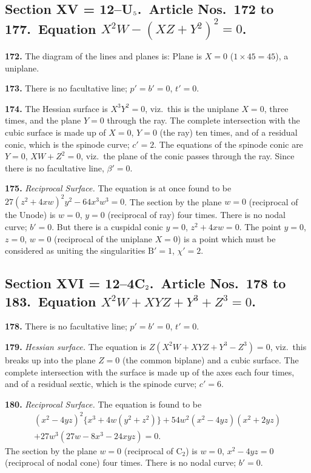 \documentclass[11pt,a4paper]{article}
\theoremstyle{definition}
\begin{document}
\subsection*{Section XV = 12--U$_{\mbox{\scriptsize 5}}$.\ Article Nos.\ 172 to 177.\ Equation $X^2W-(XZ+Y^2)^2=0$.}

\noindent\textbf{172.} The diagram of the lines and planes is: Plane is $X=0$ ($1\times 45=45$), a uniplane.

\noindent\textbf{173.} There is no facultative line; $p'=b'=0$, $t'=0$.

\noindent\textbf{174.} The Hessian surface is $X^3Y^2=0$, viz.\ this is the uniplane $X=0$, three times, and the plane $Y=0$ through the ray. The complete intersection with the cubic surface is made up of $X=0$, $Y=0$ (the ray) ten times, and of a residual conic, which is the spinode curve; $c'=2$. The equations of the spinode conic are $Y=0$, $XW+Z^2=0$, viz.\ the plane of the conic passes through the ray. Since there is no facultative line, $\beta'=0$.

\setcounter{page}{440}

\noindent\textbf{175.} \textit{Reciprocal Surface.} The equation is at once found to be $27(z^2+4xw)^2y^2-64x^3w^3=0$. The section by the plane $w=0$ (reciprocal of the Unode) is $w=0$, $y=0$ (reciprocal of ray) four times. There is no nodal curve; $b'=0$. But there is a cuspidal conic $y=0$, $z^2+4xw=0$. The point $y=0$, $z=0$, $w=0$ (reciprocal of the uniplane $X=0$) is a point which must be considered as uniting the singularities $\mathrm{B}'=1$, $\chi'=2$.

\subsection*{Section XVI = 12--4C$_{\mbox{\scriptsize 2}}$.\ Article Nos.\ 178 to 183.\ Equation $X^2W+XYZ+Y^3+Z^3=0$.}

\noindent\textbf{178.} There is no facultative line; $p'=b'=0$, $t'=0$.

\noindent\textbf{179.} \textit{Hessian surface.} The equation is $Z(X^2W+XYZ+Y^3-Z^3)=0$, viz.\ this breaks up into the plane $Z=0$ (the common biplane) and a cubic surface. The complete intersection with the surface is made up of the axes each four times, and of a residual sextic, which is the spinode curve; $c'=6$.

\noindent\textbf{180.} \textit{Reciprocal Surface.} The equation is found to be
\begin{multline*}
(x^2-4yz)^2\{x^3+4w(y^2+z^2)\} + 54w^2(x^2-4yz)(x^2+2yz) \\
+ 27w^3(27w-8x^3-24xyz)=0.
\end{multline*}
The section by the plane $w=0$ (reciprocal of C$_2$) is $w=0$, $x^2-4yz=0$ (reciprocal of nodal cone) four times. There is no nodal curve; $b'=0$.
\end{document}
